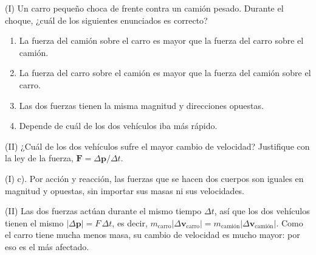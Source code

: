 \documentclass[12pt, a4paper]{article}
\begin{document}
\begin{exercise}[ID=camion, tags={parcial2}, points=18]
(I) Un carro pequeño choca de frente contra un camión pesado. Durante el choque, ¿cuál de los siguientes enunciados es correcto?
\begin{enumerate}
    \item La fuerza del camión sobre el carro es mayor que la fuerza del carro sobre el camión.
    \item La fuerza del carro sobre el camión es mayor que la fuerza del camión sobre el carro.
    \item Las dos fuerzas tienen la misma magnitud y direcciones opuestas.
    \item Depende de cuál de los dos vehículos iba más rápido.
\end{enumerate}

(II) ¿Cuál de los dos vehículos sufre el mayor cambio de velocidad? Justifique con la ley de la fuerza, $\boldsymbol{F}=\Delta\boldsymbol{p}/\Delta t$.
\end{exercise}
\begin{solution}
(I) c). Por acción y reacción, las fuerzas que se hacen dos cuerpos son iguales en magnitud y opuestas, sin importar sus masas ni sus velocidades.

(II) Las dos fuerzas actúan durante el mismo tiempo $\Delta t$, así que los dos vehículos tienen el mismo $\lvert\Delta \boldsymbol{p}\rvert = F\,\Delta t$, es decir, $m_{\text{carro}}\lvert\Delta \boldsymbol{v}_{\text{carro}}\rvert = m_{\text{camión}}\lvert\Delta \boldsymbol{v}_{\text{camión}}\rvert$. Como el carro tiene mucha menos masa, su cambio de velocidad es mucho mayor: por eso es el más afectado.
\end{solution}
\end{document}
